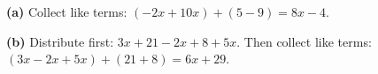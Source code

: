 \textbf{(a)} Collect like terms: $(-2x+10x)+(5-9)=\boxed{8x-4}$.

\textbf{(b)} Distribute first: $3x+21-2x+8+5x$. Then collect like terms: $(3x-2x+5x)+(21+8)=\boxed{6x+29}$.
